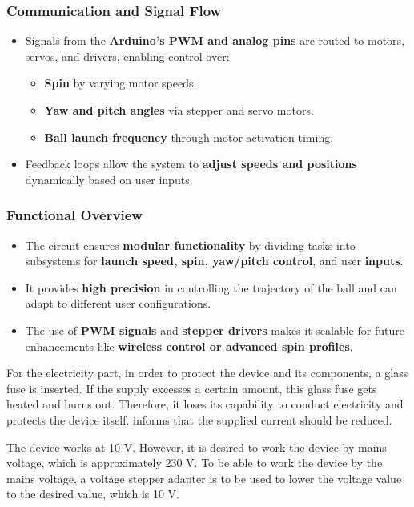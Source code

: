 \documentclass[12pt]{report}
\begin{document}
\subsubsection{Communication and Signal Flow}

\begin{itemize}
    \item Signals from the \textbf{Arduino’s PWM and analog pins} are routed to motors, servos, and drivers, enabling control over:
    \begin{itemize}
        \item \textbf{Spin} by varying motor speeds.
        \item \textbf{Yaw and pitch angles} via stepper and servo motors.
        \item \textbf{Ball launch frequency} through motor activation timing.
    \end{itemize}
    \item Feedback loops allow the system to \textbf{adjust speeds and positions} dynamically based on user inputs.
\end{itemize}

\subsubsection{Functional Overview}

\begin{itemize}
    \item The circuit ensures \textbf{modular functionality} by dividing tasks into subsystems for \textbf{launch speed, spin, yaw/pitch control}, and user \textbf{inputs}.
    \item It provides \textbf{high precision} in controlling the trajectory of the ball and can adapt to different user configurations.
    \item The use of \textbf{PWM signals} and \textbf{stepper drivers} makes it scalable for future enhancements like \textbf{wireless control or advanced spin profiles}.
\end{itemize}

For the electricity part, in order to protect the device and its components, a glass fuse is inserted. If the supply excesses a certain amount, this glass fuse gets heated and burns out. Therefore, it loses its capability to conduct electricity and protects the device itself. informs that the supplied current should be reduced. 

The device works at 10 V. However, it is desired to work the device by mains voltage, which is approximately 230 V. To be able to work the device by the mains voltage, a voltage stepper adapter is to be used to lower the voltage value to the desired value, which is 10 V.
\end{document}
